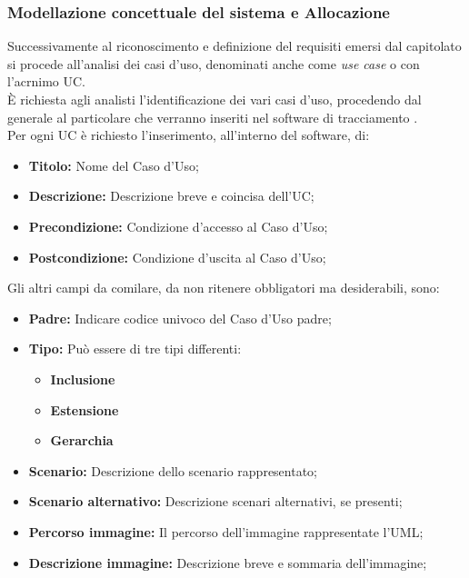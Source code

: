     \subsubsection{Modellazione concettuale del sistema e Allocazione}
      Successivamente al riconoscimento e definizione del requisiti emersi dal capitolato si procede all'analisi dei casi d'uso, denominati anche come
      \emph{use case} o con l'acrnimo UC.\\
      È richiesta agli analisti l'identificazione dei vari casi d'uso, procedendo dal generale al particolare che verranno inseriti nel software di tracciamento
      .\\
      Per ogni UC è richiesto l'inserimento, all'interno del software, di:
      \begin{itemize}
        \item \textbf{Titolo: }Nome del Caso d'Uso;
        \item \textbf{Descrizione: }Descrizione breve e coincisa dell'UC;
        \item \textbf{Precondizione: }Condizione d'accesso al Caso d'Uso;
        \item \textbf{Postcondizione: }Condizione d'uscita al Caso d'Uso;
      \end{itemize}
      Gli altri campi da comilare, da non ritenere obbligatori ma desiderabili, sono:
      \begin{itemize}
        \item \textbf{Padre: }Indicare codice univoco del Caso d'Uso padre;
        \item \textbf{Tipo: }Può essere di tre tipi differenti:
        \bgroup
          \begin{itemize}
            \item \textbf{Inclusione}
            \item \textbf{Estensione}
            \item \textbf{Gerarchia}
          \end{itemize}
        \egroup
        \item \textbf{Scenario: }Descrizione dello scenario rappresentato;
        \item \textbf{Scenario alternativo: }Descrizione scenari alternativi, se presenti;
        \item \textbf{Percorso immagine: }Il percorso dell'immagine rappresentate l'UML;
        \item \textbf{Descrizione immagine: }Descrizione breve e sommaria dell'immagine;
      \end{itemize}
